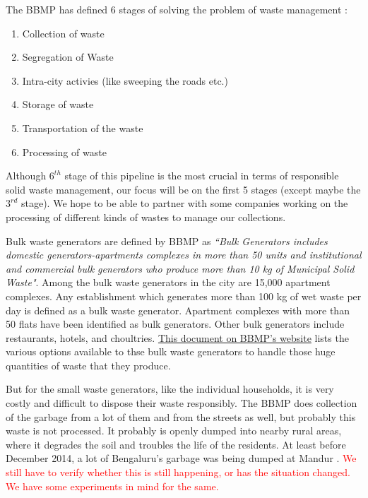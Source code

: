 \documentclass[10pt]{article}
\begin{document}
The BBMP has defined 6 stages of solving the problem of waste management \citep{BBMP:SWMOverview}:
\begin{enumerate}
\item Collection of waste
\item Segregation of Waste
\item Intra-city activies (like sweeping the roads etc.)
\item Storage of waste
\item Transportation of the waste
\item Processing of waste
\end{enumerate}
Although $6^{th}$ stage of this pipeline is the most crucial in terms of responsible solid waste management, our focus will be on the first 5 stages (except maybe the $3^{rd}$ stage). We hope to be able to partner with some companies working on the processing of different kinds of wastes to manage our collections.

Bulk waste generators are defined by BBMP as \emph{``Bulk Generators includes domestic generators-apartments complexes in more than 50 units and institutional and commercial bulk generators who produce more than 10 kg of Municipal Solid Waste"}. Among the bulk waste generators in the city are 15,000 apartment complexes. Any establishment which generates more than 100 kg of wet waste per day is defined as a bulk waste generator. Apartment complexes with more than 50 flats have been identified as bulk generators. Other bulk generators include restaurants, hotels, and choultries\citep{BangaloreMirror:bulk_waste_generators}. \href{http://bbmp.gov.in/documents/10180/2201631/Approved+Vendor+List+with+note+for+Website+21-06-2016.pdf/34567fdf-8d69-4b12-8440-9475ba4a0567}{This document on BBMP's website} lists the various options available to thse bulk waste generators to handle those huge quantities of waste that they produce.

But for the small waste generators, like the individual households, it is very costly and difficult to dispose their waste responsibly. The BBMP does collection of the garbage from a lot of them and from the streets as well, but probably this waste is not processed. It probably is openly dumped into nearby rural areas, where it degrades the soil and troubles the life of the residents. At least before December 2014, a lot of Bengaluru's garbage was being dumped at Mandur \citep{BangaloreMirror:bulk_waste_generators}.
\textcolor{red}{We still have to verify whether this is still happening, or has the situation changed. We have some experiments in mind for the same.}
\end{document}
